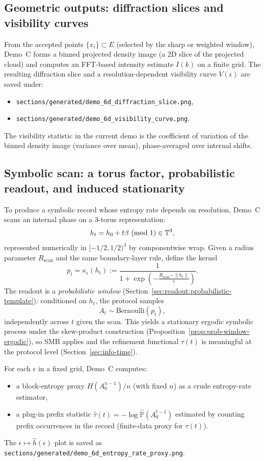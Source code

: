 \subsection{Geometric outputs: diffraction slices and visibility curves}
From the accepted points $\{x_i\}\subset E$ (selected by the sharp or weighted window), Demo~C forms a binned projected density image (a 2D slice of the projected cloud) and computes an FFT-based intensity estimate $I(k)$ on a finite grid. The resulting diffraction slice and a resolution-dependent visibility curve $V(\epsilon)$ are saved under:
\begin{itemize}[leftmargin=*,itemsep=2pt]
  \item \texttt{sections/generated/demo\_6d\_diffraction\_slice.png},
  \item \texttt{sections/generated/demo\_6d\_visibility\_curve.png}.
\end{itemize}
The visibility statistic in the current demo is the coefficient of variation of the binned density image (variance over mean), phase-averaged over internal shifts.

\subsection{Symbolic scan: a torus factor, probabilistic readout, and induced stationarity}
To produce a symbolic record whose entropy rate depends on resolution, Demo~C scans an internal phase on a $3$-torus representation:
\[
h_t=h_0+t\beta\ (\mathrm{mod}\ 1)\in\TT^3,
\]
represented numerically in $[-1/2,1/2)^3$ by componentwise wrap. Given a radius parameter $R_{\mathrm{scan}}$ and the same boundary-layer rule, define the kernel
\[
p_t=\kappa_\epsilon(h_t):=\frac{1}{1+\exp\!\left(-\frac{R_{\mathrm{scan}}-\|h_t\|}{\epsilon}\right)}.
\]
The readout is a \emph{probabilistic window} (Section~\ref{sec:readout:probabilistic-template}): conditioned on $h_t$, the protocol samples
\[
A_t\sim \mathrm{Bernoulli}(p_t),
\]
independently across $t$ given the scan. This yields a stationary ergodic symbolic process under the skew-product construction (Proposition~\ref{prop:prob-window-ergodic}), so SMB applies and the refinement functional $\tau(t)$ is meaningful at the protocol level (Section~\ref{sec:info-time}).

For each $\epsilon$ in a fixed grid, Demo~C computes:
\begin{itemize}[leftmargin=*,itemsep=2pt]
  \item a block-entropy proxy $H(A_0^{n-1})/n$ (with fixed $n$) as a crude entropy-rate estimator,
  \item a plug-in prefix statistic $\widehat{\tau}(t)=-\log\widehat{\mathbb{P}}(A_0^{t-1})$ estimated by counting prefix occurrences in the record (finite-data proxy for $\tau(t)$).
\end{itemize}
The $\epsilon\mapsto \widehat h(\epsilon)$ plot is saved as \texttt{sections/generated/demo\_6d\_entropy\_rate\_proxy.png}.

